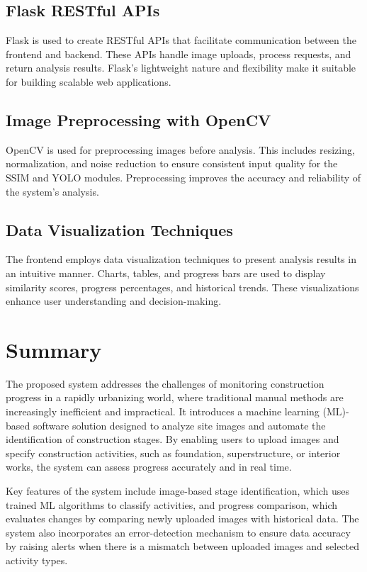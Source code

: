 \documentclass[12pt,a4paper]{report}
\begin{document}
\subsection{Flask RESTful APIs}
Flask is used to create RESTful APIs that facilitate communication between the frontend and backend. These APIs handle image uploads, process requests, and return analysis results. Flask's lightweight nature and flexibility make it suitable for building scalable web applications.

\subsection{Image Preprocessing with OpenCV}
OpenCV is used for preprocessing images before analysis. This includes resizing, normalization, and noise reduction to ensure consistent input quality for the SSIM and YOLO modules. Preprocessing improves the accuracy and reliability of the system's analysis.

\subsection{Data Visualization Techniques}
The frontend employs data visualization techniques to present analysis results in an intuitive manner. Charts, tables, and progress bars are used to display similarity scores, progress percentages, and historical trends. These visualizations enhance user understanding and decision-making.

\section{Summary}
The proposed system addresses the challenges of monitoring construction progress in a rapidly urbanizing world, where traditional manual methods are increasingly inefficient and impractical. It introduces a machine learning (ML)-based software solution designed to analyze site images and automate the identification of construction stages. By enabling users to upload images and specify construction activities, such as foundation, superstructure, or interior works, the system can assess progress accurately and in real time.

Key features of the system include image-based stage identification, which uses trained ML algorithms to classify activities, and progress comparison, which evaluates changes by comparing newly uploaded images with historical data. The system also incorporates an error-detection mechanism to ensure data accuracy by raising alerts when there is a mismatch between uploaded images and selected activity types.
\end{document}
